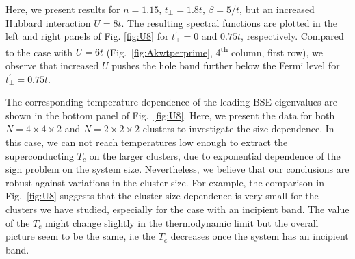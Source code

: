 \documentclass[prb,twocolumn,amsmath,amssymb,superscriptaddress,floatfix,nofootinbib]{revtex4-2}
\begin{document}
Here, we present results for $n=1.15$, $t_\perp =1.8t$, $\beta=5/t$, but an increased Hubbard interaction $U=8t$. The resulting spectral functions are plotted in the left and right panels of Fig. \ref{fig:U8} for $t_\perp^{\prime}=0$ and $0.75t$, respectively. Compared to the case with $U=6t$ (Fig.~\ref{fig:Akwtperprime}, 4\textsuperscript{th} column, first row), we observe that increased $U$ pushes the hole band further below the Fermi level for $t_\perp^{\prime}=0.75t$. 

The corresponding temperature dependence of the leading BSE eigenvalues are shown in the bottom panel of Fig.~\ref{fig:U8}. Here, we present the data for both $N = 4\times 4\times 2$ and $N = 2\times 2\times 2$ clusters to investigate the size dependence. In this case, we can not reach temperatures low enough to extract the superconducting $T_c$ on the larger clusters, due to exponential dependence of the sign problem on the system size. Nevertheless, we believe that our conclusions are robust against variations in the cluster size. For example, the comparison 
in Fig.~\ref{fig:U8} suggests that the cluster size dependence is very small for the clusters we have studied, especially for the case with an incipient band. The value of the $T_c$ might change slightly in the thermodynamic limit but the overall picture seem to be the same, i.e the $T_c$ decreases once the system has an incipient band. 
\end{document}
